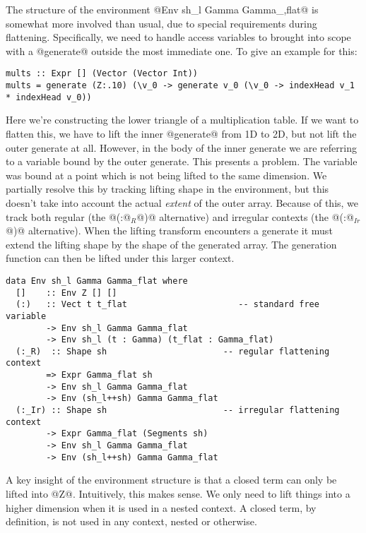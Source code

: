 The structure of the environment @Env sh_l  Gamma  Gamma_,flat@ is somewhat more involved than usual, due to special requirements during flattening. Specifically, we need to handle access variables to brought into scope with a @generate@ outside the most immediate one. To give an example for this:
%
\begin{lstlisting}
mults :: Expr [] (Vector (Vector Int))
mults = generate (Z:.10) (\v_0 -> generate v_0 (\v_0 -> indexHead v_1 * indexHead v_0))
\end{lstlisting}
%
Here we're constructing the lower triangle of a multiplication table. If we want to flatten this, we have to lift the inner @generate@ from 1D to 2D, but not lift the outer generate at all. However, in the body of the inner generate we are referring to a variable bound by the outer generate. This presents a problem. The variable was bound at a point which is not being lifted to the same dimension. We partially resolve this by tracking lifting shape in the environment, but this doesn't take into account the actual \emph{extent} of the outer array. Because of this, we track both regular (the @(:@$_R$@)@ alternative) and irregular contexts (the @(:@$_{Ir}$@)@ alternative). When the lifting transform encounters a generate it must extend the lifting shape by the shape of the generated array. The generation function can then be lifted under this larger context.
%
\begin{lstlisting}[style=ndp]
data Env sh_l Gamma Gamma_flat where
  []    :: Env Z [] []
  (:)   :: Vect t t_flat                      -- standard free variable
        -> Env sh_l Gamma Gamma_flat
        -> Env sh_l (t : Gamma) (t_flat : Gamma_flat)
  (:_R)  :: Shape sh                       -- regular flattening context
        => Expr Gamma_flat sh
        -> Env sh_l Gamma Gamma_flat
        -> Env (sh_l++sh) Gamma Gamma_flat
  (:_Ir) :: Shape sh                       -- irregular flattening context
        -> Expr Gamma_flat (Segments sh)
        -> Env sh_l Gamma Gamma_flat
        -> Env (sh_l++sh) Gamma Gamma_flat
\end{lstlisting}

A key insight of the environment structure is that a closed term can only be lifted into @Z@. Intuitively, this makes sense. We only need to lift things into a higher dimension when it is used in a nested context. A closed term, by definition, is not used in any context, nested or otherwise.


